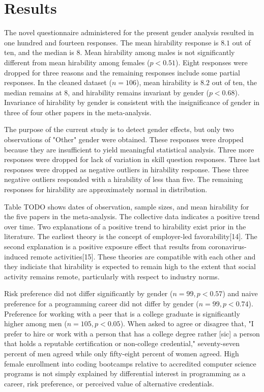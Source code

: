 \documentclass[review]{elsarticle}
\begin{document}
\section{Results}

The novel questionnaire administered for the present gender analysis resulted in one hundred and fourteen responses.
The mean hirability response is $8.1$ out of ten, and the median is $8$.
Mean hirability among males is not significantly different from mean hirability among females ($p < 0.51$).
Eight responses were dropped for three reasons and the remaining responses include some partial responses.
In the cleaned dataset ($n = 106$), mean hirability is $8.2$ out of ten,
the median remains at $8$, and hirability remains invariant by gender ($p < 0.68$).
Invariance of hirability by gender is consistent with the insignificance of gender in three of four other papers in the meta-analysis.

The purpose of the current study is to detect gender effects, but only two observations of "Other" gender were obtained.
These responses were dropped because they are insufficient to yield meaningful statistical analysis.
Three more responses were dropped for lack of variation in skill question responses.
Three last responses were dropped as negative outliers in hirability response.
These three negative outliers responded with a hirability of less than five.
The remaining responses for hirability are approximately normal in distribution.

Table TODO shows dates of observation, sample sizes, and mean hirability for the five papers in the meta-analysis.
The collective data indicates a positive trend over time.
Two explanations of a positive trend to hirability exist prior in the literature.
The earliest theory is the concept of employer-led favorability[14].
The second explanation is a positive exposure effect that results from coronavirus-induced remote activities[15].
These theories are compatible with each other and they indiciate that hirability is expected to remain high
to the extent that social activity remains remote, particularly with respect to industry norms.

Risk preference did not differ significantly by gender ($n = 99, p < 0.57$)
and naive preference for a programming career did not differ by gender ($n = 99, p < 0.74$).
Preference for working with a peer that is a college graduate is significantly higher among men ($n = 105, p < 0.05$).
When asked to agree or disagree that, "I prefer to hire or work with a person that has a college degree
rather [sic] a person that holds a reputable certification or non-college credential,"
seventy-seven percent of men agreed while only fifty-eight percent of women agreed.
High female enrollment into coding bootcamps
relative to accredited computer science programs is not simply explained
by differential interest in programming as a career,
risk preference,
or perceived value of alternative credentials.
\end{document}

